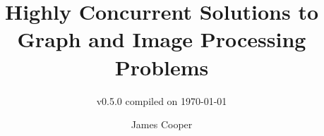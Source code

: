 \documentclass[newzealand,10pt,partial,onehalfspace,examcopy,final]{aucklandthesis}
\theoremstyle{plain}
\begin{document}
\frontmatter

%
%
%
\title{Highly Concurrent Solutions to Graph and Image Processing Problems}
\subtitle{{\small v0.5.0 compiled on \today}}
\author{James Cooper}

\maketitle
{}




\cleardoublepage\tableofcontents
\cleardoublepage\listoffixmes
\cleardoublepage\listoffigures
\cleardoublepage\listoftables
\cleardoublepage\listofcprulesetfloats
\cleardoublepage\listofcpobjectsfloats
\cleardoublepage\printglossary
\cleardoublepage\printglossary[type=\acronymtype]






%
%
%
%


\mainmatter
\makeatletter
\@mainmattertrue
\makeatother
\setcounter{secnumdepth}{\value{maxsecnumdepth}}
\end{document}
